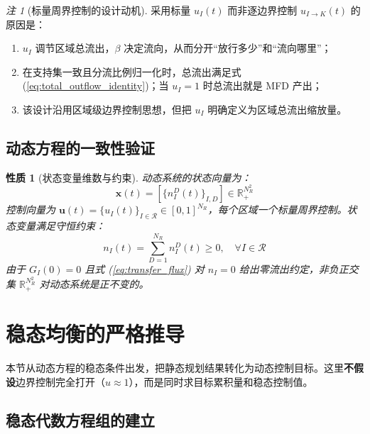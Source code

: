 \documentclass[a4paper,12pt]{article}
\theoremstyle{plain}
\newtheorem{property}[theorem]{性质}
\theoremstyle{definition}
\theoremstyle{remark}
\newtheorem{remark}[theorem]{注}
\begin{document}
\begin{remark}[标量周界控制的设计动机]\label{rem:scalar_control}
采用标量 $u_I(t)$ 而非逐边界控制 $u_{I \to K}(t)$ 的原因是：
\begin{enumerate}
    \item $u_I$ 调节区域总流出，$\beta$ 决定流向，从而分开“放行多少”和“流向哪里”；
    \item 在支持集一致且分流比例归一化时，总流出满足式 (\ref{eq:total_outflow_identity})；当 $u_I = 1$ 时总流出就是 MFD 产出；
    \item 该设计沿用区域级边界控制思想，但把 $u_I$ 明确定义为区域总流出缩放量。
\end{enumerate}
\end{remark}

\subsection{动态方程的一致性验证}

\begin{property}[状态变量维数与约束]\label{prop:dynamic_consistency}
动态系统的状态向量为：
\begin{equation}
    \bm{x}(t) = \left[\{n_I^D(t)\}_{I,D}\right] \in \mathbb{R}_{+}^{N_R^2}
\end{equation}
控制向量为 $\bm{u}(t) = \{u_I(t)\}_{I \in \mathcal{R}} \in [0,1]^{N_R}$，每个区域一个标量周界控制。状态变量满足守恒约束：
\begin{equation}
    n_I(t) = \sum_{D=1}^{N_R} n_I^D(t) \ge 0, \quad \forall I \in \mathcal{R}
\end{equation}
由于 $G_I(0)=0$ 且式 (\ref{eq:transfer_flux}) 对 $n_I=0$ 给出零流出约定，非负正交集 $\mathbb R_+^{N_R^2}$ 对动态系统是正不变的。
\end{property}

\section{稳态均衡的严格推导}

本节从动态方程的稳态条件出发，把静态规划结果转化为动态控制目标。这里\textbf{不假设}边界控制完全打开（$u\approx 1$），而是同时求目标累积量和稳态控制值。

\subsection{稳态代数方程组的建立}
\end{document}
